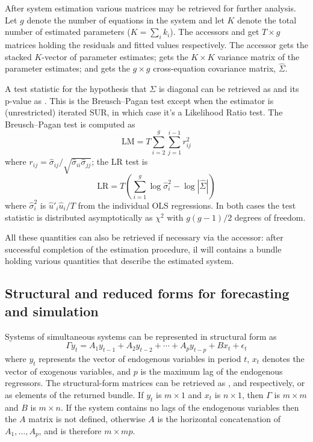 After system estimation various matrices may be retrieved for further
analysis.  Let $g$ denote the number of equations in the system and
let $K$ denote the total number of estimated parameters ($K = \sum_i
k_i$). The accessors  and  get $T \times g$
matrices holding the residuals and fitted values respectively. The
accessor  gets the stacked $K$-vector of parameter
estimates;  gets the $K \times K$ variance matrix of the
parameter estimates; and  gets the $g \times g$
cross-equation covariance matrix, $\hat{\Sigma}$.

A test statistic for the hypothesis that $\Sigma$ is diagonal can be
retrieved as  and its p-value as
. This is the Breusch--Pagan test except when the
estimator is (unrestricted) iterated SUR, in which case it's a
Likelihood Ratio test. The Breusch--Pagan test is computed as
\[
\mbox{LM} = T \sum_{i=2}^g \sum_{j=1}^{i-1} r^2_{ij}
\]
where $r_{ij} = \hat{\sigma}_{ij} /
\sqrt{\hat{\sigma}_{ii}\hat{\sigma}_{jj}}$; the LR test is
\[
\mbox{LR} = T \left(\sum_{i=1}^g \log \hat{\sigma}^2_i -\log 
 |\hat{\Sigma}| \right)
\]
where $\hat{\sigma}^2_i$ is $\hat{u}'_i \hat{u}_i / T$ from the
individual OLS regressions. In both cases the test statistic is
distributed asymptotically as $\chi^2$ with $g(g-1)/2$ degrees of
freedom. 

All these quantities can also be retrieved if necessary via the
 accessor: after successful completion of the estimation
procedure, il will contains a bundle holding various quantities that
describe the estimated system.

\subsection{Structural and reduced forms for forecasting and simulation}

Systems of simultaneous systems can be represented in structural form
as
\[
\Gamma y_t = A_1 y_{t-1} + A_2 y_{t-2} + \cdots + A_p y_{t-p}
 + B x_t + \epsilon_t
\]
where $y_t$ represents the vector of endogenous variables in period
$t$, $x_t$ denotes the vector of exogenous variables, and $p$ is the
maximum lag of the endogenous regressors.  The structural-form
matrices can be retrieved as ,  and
 respectively, or as elements of the returned
 bundle. If $y_t$ is $m \times 1$
and $x_t$ is $n \times 1$, then $\Gamma$ is $m \times m$ and $B$ is
$m \times n$. If the system contains no lags of the endogenous
variables then the $A$ matrix is not defined, otherwise $A$ is the
horizontal concatenation of $A_1,\dots,A_p$, and is therefore
$m \times mp$.

